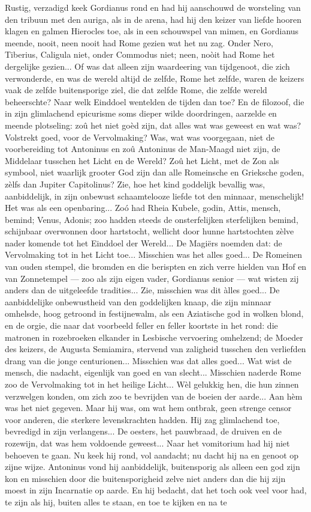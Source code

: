 \documentclass[a4paper, 12pt, oneside, dutch]{article}
\begin{document}
Rustig, verzadigd keek Gordianus rond en had hij aanschouwd de worsteling van den tribuun met den auriga, als in de arena, had hij den keizer van liefde hooren klagen en galmen Hierocles toe, als in een schouwspel van mimen, en Gordianus meende, nooit, neen nooit had Rome gezien wat het nu zag. Onder Nero, Tiberius, Caligula niet, onder Commodus niet; neen, noòit had Rome het dergelijke gezien... Of was dat alleen zijn waardeering van tijdgenoot, die zich verwonderde, en was de wereld altijd de zelfde, Rome het zelfde, waren de keizers vaak de zelfde buitensporige ziel, die dat zelfde Rome, die zelfde wereld beheerschte? Naar welk Einddoel wentelden de tijden dan toe? En de filozoof, die in zijn glimlachend epicurisme soms dieper wilde doordringen, aarzelde en meende plotseling: zoû het niet goèd zijn, dat alles wat was geweest en wat was? Volstrekt goed, voor de Vervolmaking? Was, wat was voorgegaan, niet de voorbereiding tot Antoninus en zoû Antoninus de Man-Maagd niet zijn, de Middelaar tusschen het Licht en de Wereld? Zoû het Licht, met de Zon als symbool, niet waarlijk grooter God zijn dan alle Romeinsche en Grieksche goden, zèlfs dan Jupiter Capitolinus? Zie, hoe het kind goddelijk bevallig was, aanbiddelijk, in zijn onbewust schaamtelooze liefde tot den minnaar, menschelijk! Het was als een openbaring... Zoó had Rheia Kubele, godin, Attis, mensch, bemind; Venus, Adonis; zoo hadden steeds de onsterfelijken sterfelijken bemind, schijnbaar overwonnen door hartstocht, wellicht door hunne hartstochten zèlve nader komende tot het Einddoel der Wereld... De Magiërs noemden dat: de Vervolmaking tot in het Licht toe... Misschien was het alles goed... De Romeinen van ouden stempel, die bromden en die berispten en zich verre hielden van Hof en van Zonnetempel --- zoo als zijn eigen vader, Gordianus senior --- wat wisten zij anders dan de uitgeleefde tradities... Zie, misschien was dit àlles goed... De aanbiddelijke onbewustheid van den goddelijken knaap, die zijn minnaar omhelsde, hoog getroond in festijnewalm, als een Aziatische god in wolken blond, en de orgie, die naar dat voorbeeld feller en feller koortste in het rond: die matronen in rozebroeken elkander in Lesbische vervoering omhelzend; de Moeder des keizers, de Augusta Semiamira, stervend van zaligheid tusschen den verliefden drang van die jonge centurionen... Misschien was dat alles goed... Wat wist de mensch, die nadacht, eigenlijk van goed en van slecht... Misschien naderde Rome zoo de Vervolmaking tot in het heilige Licht... Wèl gelukkig hen, die hun zinnen verzwelgen konden, om zich zoo te bevrijden van de boeien der aarde... Aan hèm was het niet gegeven. Maar hij was, om wat hem ontbrak, geen strenge censor voor anderen, die sterkere levenskrachten hadden. Hij zag glimlachend toe, bevredigd in zijn verlangens... De oesters, het pauwbraad, de druiven en de rozewijn, dat was hem voldoende geweest... Naar het vomitorium had hij niet behoeven te gaan. Nu keek hij rond, vol aandacht; nu dacht hij na en genoot op zijne wijze. Antoninus vond hij aanbiddelijk, buitensporig als alleen een god zijn kon en misschien door die buitensporigheid zelve niet anders dan die hij zijn moest in zijn Incarnatie op aarde. En hij bedacht, dat het toch ook veel voor had, te zijn als hij, buiten alles te staan, en toe te kijken en na te 
\end{document}
